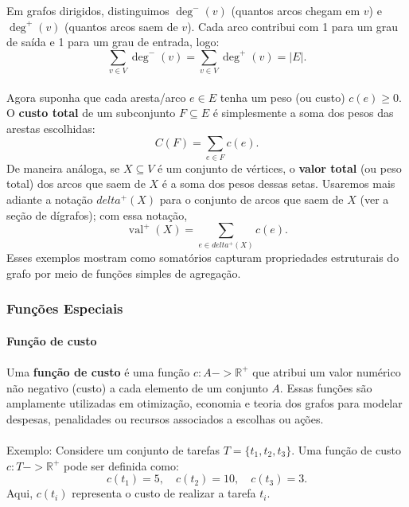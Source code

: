 \documentclass[12pt,a4paper]{article}
\def\emph#1{#1}%
\def\to{->}%
\def\delta{delta}%
\begin{document}
Em grafos dirigidos, distinguimos \(\deg^{-}(v)\) (quantos arcos \emph{chegam} em \(v\)) e \(\deg^{+}(v)\) (quantos arcos \emph{saem} de \(v\)). Cada arco contribui com 1 para um grau de saída e 1 para um grau de entrada, logo:
\[\sum_{v\in V} \deg^{-}(v) = \sum_{v\in V} \deg^{+}(v) = |E|.\]

\paragraph{}
Agora suponha que cada aresta/arco \(e\in E\) tenha um \emph{peso} (ou \emph{custo}) \(c(e)\ge 0\). O \textbf{custo total} de um subconjunto \(F\subseteq E\) é simplesmente a soma dos pesos das arestas escolhidas:
\[C(F) = \sum_{e\in F} c(e).\]
De maneira análoga, se \(X\subseteq V\) é um conjunto de vértices, o \textbf{valor total} (ou peso total) dos arcos que \emph{saem} de \(X\) é a soma dos pesos dessas setas. Usaremos mais adiante a notação \(\delta^{+}(X)\) para o conjunto de arcos que saem de \(X\) (ver a seção de dígrafos); com essa notação,
\[\operatorname{val}^+(X) = \sum_{e\in \delta^{+}(X)} c(e).\]
Esses exemplos mostram como somatórios capturam propriedades estruturais do grafo por meio de funções simples de agregação.

\subsubsection{Funções Especiais}

\paragraph{Função de custo}
\paragraph{}Uma \textbf{função de custo} é uma função \(c: A \to \mathbb{R}^+\) que atribui um valor numérico não negativo (custo) a cada elemento de um conjunto \(A\). Essas funções são amplamente utilizadas em otimização, economia e teoria dos grafos para modelar despesas, penalidades ou recursos associados a escolhas ou ações.

\paragraph{}
Exemplo: Considere um conjunto de tarefas \(T = \{t_1, t_2, t_3\}\). Uma função de custo \(c: T \to \mathbb{R}^+\) pode ser definida como:
\[c(t_1) = 5, \quad c(t_2) = 10, \quad c(t_3) = 3.\]
Aqui, \(c(t_i)\) representa o custo de realizar a tarefa \(t_i\). 
\end{document}
